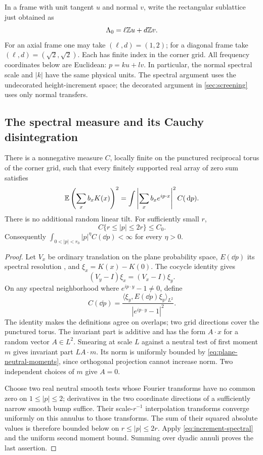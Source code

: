 In a frame with unit tangent $u$ and normal $v$, write the rectangular
sublattice just obtained as
\[
 \Lambda_0=\ell\mathbb Z u+d\mathbb Z v.
\]
For an axial frame one may take $(\ell,d)=(1,2)$; for a diagonal frame take
$(\ell,d)=(\sqrt2,\sqrt2)$. Each has finite index in the corner grid. All
frequency coordinates below are Euclidean: $p=ku+lv$. In particular, the
normal spectral scale and $|k|$ have the same physical units.
The spectral argument uses the undecorated height-increment space; the
decorated argument in \cref{sec:screening} uses only normal transfers.

\subsection{The spectral measure and its Cauchy disintegration}

\begin{lemma}
\label{lem:increment-spectral}
There is a nonnegative measure $C$, locally finite on the punctured reciprocal
torus of the corner grid, such that every finitely supported real array of
zero sum satisfies
\begin{equation}
 \mathbb E\left(\sum_x b_xK(x)\right)^2
   =\int\left|\sum_x b_x e^{ip\cdot x}\right|^2 C(\,\mathrm d p).
 \label{eq:increment-spectral}
\end{equation}
There is no additional random linear tilt. For sufficiently small $r$,
\begin{equation}
 C\{r\le|p|\le2r\}\le C_0.
 \label{eq:spectral-annulus}
\end{equation}
Consequently $\int_{0<|p|<r_0}|p|^\eta C(\dd p)<\infty$ for every $\eta>0$.
\end{lemma}

\begin{proof}
Let $V_x$ be ordinary translation on the plane probability space, $E(\dd p)$
its spectral resolution \cite[Theorem~5.6]{WilliamsSpectral2018},
and $\xi_x=K(x)-K(0)$. The cocycle identity gives
\[
 (V_y-I)\xi_x=(V_x-I)\xi_y.
\]
On any spectral neighborhood where $e^{ip\cdot y}-1\ne0$, define
\[
 C(\dd p)=
 \frac{\langle\xi_y,E(\dd p)\xi_y\rangle_{L^2}}
 {|e^{ip\cdot y}-1|^2}.
\]
The identity makes the definitions agree on overlaps; two grid directions
cover the punctured torus. The invariant part is additive and has the form
$A\cdot x$ for a random vector $A\in L^2$. Smearing at scale $L$ against a
neutral test of first moment $m$ gives invariant part $LA\cdot m$.
Its norm is uniformly bounded by \cref{eq:plane-neutral-moments}, since
orthogonal projection cannot increase norm. Two independent choices of $m$
give $A=0$.

Choose two real neutral smooth tests whose Fourier transforms have no common
zero on $1\le|p|\le2$; derivatives in the two coordinate directions of a
sufficiently narrow smooth bump suffice. Their scale-$r^{-1}$ interpolation
transforms converge uniformly on this annulus to those transforms. The sum
of their squared absolute values is therefore bounded below on
$r\le|p|\le2r$. Apply \cref{eq:increment-spectral} and the uniform second
moment bound. Summing over dyadic annuli proves the last assertion.
\end{proof}

